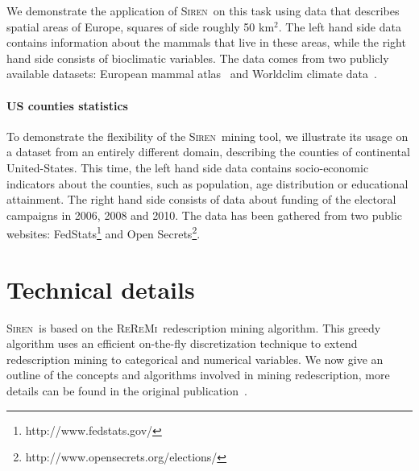 \documentclass{sig-alternate}
\newcommand{\prg}[1]{\paragraph{#1}}
\newcommand{\Siren}{\textsc{Siren}}
\newcommand{\ReReMi}{\textsc{ReReMi}}
\begin{document}
We demonstrate the application of \Siren\ on this task using data
that describes spatial areas of Europe, squares of side roughly 50
km$^2$.  The left hand side data contains information about the
mammals that live in these areas, while the right hand side consists
of bioclimatic variables. The data comes from two publicly available
datasets: European mammal atlas~\cite{mitchell-jones99atlas} and
Worldclim climate data~\cite{hijmans05very}.

\prg{US counties statistics}


To demonstrate the flexibility of the \Siren\ mining tool, we illustrate its usage on
a dataset from an entirely different domain, describing the counties
of continental United-States.  This time, the left hand side data
contains socio-economic indicators about the counties, such as
population, age distribution or educational attainment. The right hand
side consists of data about funding of the electoral campaigns in
2006, 2008 and 2010. The data has been gathered from two public
websites: FedStats\footnote{http://www.fedstats.gov/} and Open
Secrets\footnote{http://www.opensecrets.org/elections/}.

\section{Technical details}
\Siren\ is based on the \ReReMi\ redescription mining
algorithm. This greedy algorithm uses an
efficient on-the-fly discretization technique to extend redescription
mining to categorical and numerical variables.
We now give an outline of the concepts and algorithms involved in mining redescription, more details can be found in the original publication~\cite{galbrun11black}. 
\end{document}
